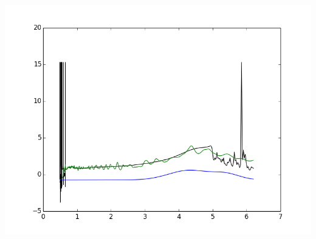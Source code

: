 \documentclass{article}
\begin{document}
\includegraphics{"normPXD1-659-D2O.asc.png"}
\end{document}
